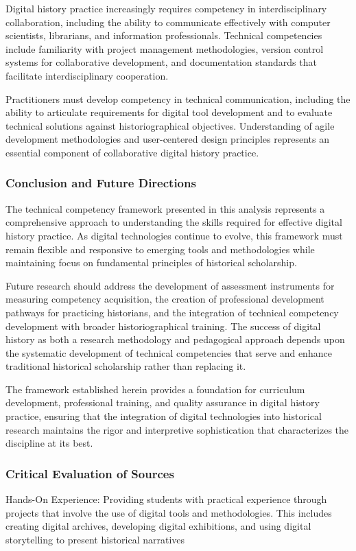 Digital history practice increasingly requires competency in interdisciplinary collaboration, including the ability to communicate effectively with computer scientists, librarians, and information professionals. Technical competencies include familiarity with project management methodologies, version control systems for collaborative development, and documentation standards that facilitate interdisciplinary cooperation.

Practitioners must develop competency in technical communication, including the ability to articulate requirements for digital tool development and to evaluate technical solutions against historiographical objectives. Understanding of agile development methodologies and user-centered design principles represents an essential component of collaborative digital history practice.

\subsubsection{Conclusion and Future Directions}

The technical competency framework presented in this analysis represents a comprehensive approach to understanding the skills required for effective digital history practice. As digital technologies continue to evolve, this framework must remain flexible and responsive to emerging tools and methodologies while maintaining focus on fundamental principles of historical scholarship.

Future research should address the development of assessment instruments for measuring competency acquisition, the creation of professional development pathways for practicing historians, and the integration of technical competency development with broader historiographical training. The success of digital history as both a research methodology and pedagogical approach depends upon the systematic development of technical competencies that serve and enhance traditional historical scholarship rather than replacing it.

The framework established herein provides a foundation for curriculum development, professional training, and quality assurance in digital history practice, ensuring that the integration of digital technologies into historical research maintains the rigor and interpretive sophistication that characterizes the discipline at its best.


\subsubsection{Critical Evaluation of Sources}
Hands-On Experience: Providing students with practical experience through projects that involve the use of digital tools and methodologies. 
This includes creating digital archives, developing digital exhibitions, and using digital storytelling to present historical narratives

